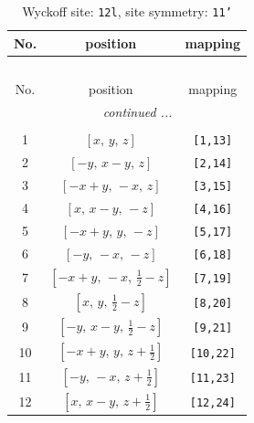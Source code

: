 \documentclass[fleqn,8pt]{jsarticle}
\begin{document}
\begin{longtable}{ccc}
\caption{Wyckoff site: {\tt 12l}, site symmetry: {\tt 11'}}
 \\
 \hline \hline
No. & position & mapping \\ \hline \endfirsthead

\multicolumn{2}{l}{\tablename\ \thetable{}} \\
 \hline \hline
No. & position & mapping \\ \hline \endhead

 \hline \hline
\multicolumn{2}{r}{\footnotesize\it continued ...} \\ \endfoot

 \hline \hline
\multicolumn{2}{r}{} \\ \endlastfoot

1 & $\left[ x,\, y,\, z \right]$ & {\tt [1,13]} \\ \hline
2 & $\left[ - y,\, x - y,\, z \right]$ & {\tt [2,14]} \\ \hline
3 & $\left[ - x + y,\, - x,\, z \right]$ & {\tt [3,15]} \\ \hline
4 & $\left[ x,\, x - y,\, - z \right]$ & {\tt [4,16]} \\ \hline
5 & $\left[ - x + y,\, y,\, - z \right]$ & {\tt [5,17]} \\ \hline
6 & $\left[ - y,\, - x,\, - z \right]$ & {\tt [6,18]} \\ \hline
7 & $\left[ - x + y,\, - x,\, \frac{1}{2} - z \right]$ & {\tt [7,19]} \\ \hline
8 & $\left[ x,\, y,\, \frac{1}{2} - z \right]$ & {\tt [8,20]} \\ \hline
9 & $\left[ - y,\, x - y,\, \frac{1}{2} - z \right]$ & {\tt [9,21]} \\ \hline
10 & $\left[ - x + y,\, y,\, z + \frac{1}{2} \right]$ & {\tt [10,22]} \\ \hline
11 & $\left[ - y,\, - x,\, z + \frac{1}{2} \right]$ & {\tt [11,23]} \\ \hline
12 & $\left[ x,\, x - y,\, z + \frac{1}{2} \right]$ & {\tt [12,24]} \\
\end{longtable}
\end{document}
